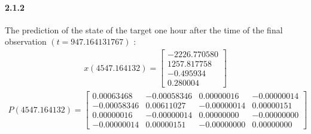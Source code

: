 \documentclass[a4paper]{article}
\begin{document}
\paragraph{2.1.2 } The prediction of the state of the target one hour after the time of the final observation $(t=947.164131767)$ : \\
\begin{align*}
x(4547.164132) = \begin{bmatrix}
		  	-2226.770580 \\
   			1257.817758 \\
     		-0.495934 \\
      		0.280004 
	\end{bmatrix}
\end{align*}
\begin{align*}
P(4547.164132) = \begin{bmatrix}
    0.00063468  &  -0.00058346  &   0.00000016  &  -0.00000014 \\
   -0.00058346  &   0.00611027  &  -0.00000014  &   0.00000151 \\
    0.00000016  &  -0.00000014  &   0.00000000  &  -0.00000000 \\
   -0.00000014  &   0.00000151  &  -0.00000000  &   0.00000000
	\end{bmatrix}
\end{align*} \\
\end{document}

